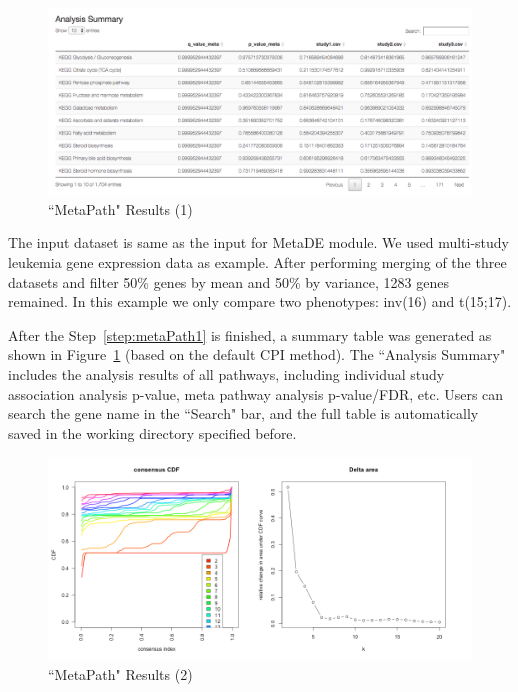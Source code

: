 \begin{figure}[H]
\begin{center}
\includegraphics[scale=0.3]{./figure/metaPath/metaPathresult1.png}
\caption{``MetaPath" Results (1)}
\label{fig:MetaPathresult1}
\end{center}
\end{figure}

The input dataset is same as the input for MetaDE module.
We used multi-study leukemia gene expression data as example.
After performing merging of the three datasets and filter 50\% genes by mean and 50\% by variance, 1283 genes remained.
In this example we only compare two phenotypes: inv(16) and t(15;17).

After the Step~\ref{step:metaPath1} is finished, a summary table was generated as shown in Figure~\ref{fig:MetaPathresult1} (based on the default CPI method). The ``Analysis Summary" includes the analysis results of all pathways, including individual study association analysis p-value, meta pathway analysis p-value/FDR, etc. Users can search the gene name in the ``Search" bar, and the full table is automatically saved in the working directory specified before.  

\begin{figure}[H]
\begin{center}
\includegraphics[scale=0.45]{./figure/metaPath/metaPathresult2.png}
\caption{``MetaPath" Results (2)}
\label{fig:MetaPathresult2}
\end{center}
\end{figure}

